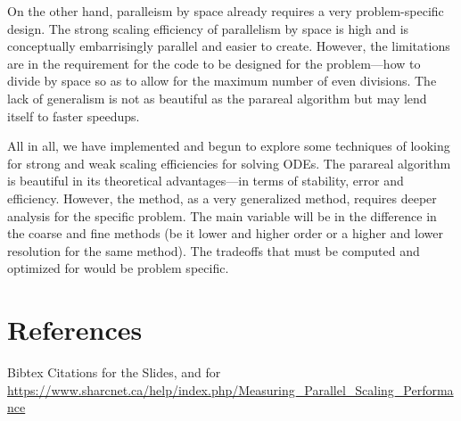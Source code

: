 \documentclass[letterpaper,11pt]{article}
\begin{document}
On the other hand, paralleism by space already requires a very problem-specific
design. The strong scaling efficiency of parallelism by space is high and is
conceptually embarrisingly parallel and easier to create. However, the
limitations are in the requirement for the code to be designed for the
problem---how to divide by space so as to allow for the maximum number of even
divisions. The lack of generalism is not as beautiful as the parareal algorithm
but may lend itself to faster speedups.

All in all, we have implemented and begun to explore some techniques of looking
for strong and weak scaling efficiencies for solving ODEs. The parareal
algorithm is beautiful in its theoretical advantages---in terms of stability,
error and efficiency. However, the method, as a very generalized method,
requires deeper analysis for the specific problem. The main variable will be in
the difference in the coarse and fine methods (be it lower and higher order or a
higher and lower resolution for the same method). The tradeoffs that must be
computed and optimized for would be problem specific.

\section{References}

Bibtex Citations for the Slides, and for \url{https://www.sharcnet.ca/help/index.php/Measuring_Parallel_Scaling_Performance}
\end{document}
